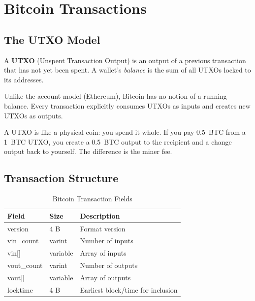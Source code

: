 \documentclass[12pt,a4paper,openany]{book}
\theoremstyle{definition}
\theoremstyle{plain}
\theoremstyle{remark}
\begin{document}
\chapter{Bitcoin Transactions}
\label{chap:btctx}

\section{The UTXO Model}

\begin{definitionbox}
  A \textbf{UTXO} (Unspent Transaction Output) is an output of a
  previous transaction that has not yet been spent.  A wallet's
  \emph{balance} is the sum of all UTXOs locked to its addresses.
\end{definitionbox}

Unlike the account model (Ethereum), Bitcoin has no notion of a running
balance.  Every transaction explicitly consumes UTXOs as inputs and
creates new UTXOs as outputs.

\begin{keyinsight}
  A UTXO is like a physical coin: you spend it whole.  If you pay 0.5~BTC
  from a 1~BTC UTXO, you create a 0.5~BTC output to the recipient and a
  change output back to yourself.  The difference is the miner fee.
\end{keyinsight}

\section{Transaction Structure}

\begin{table}[h]
\centering
\caption{Bitcoin Transaction Fields}
\begin{tabular}{lll}
\toprule
\textbf{Field} & \textbf{Size} & \textbf{Description} \\
\midrule
version     & 4 B & Format version \\
vin\_count  & varint & Number of inputs \\
vin[]       & variable & Array of inputs \\
vout\_count & varint & Number of outputs \\
vout[]      & variable & Array of outputs \\
locktime    & 4 B & Earliest block/time for inclusion \\
\bottomrule
\end{tabular}
\end{table}
\end{document}
